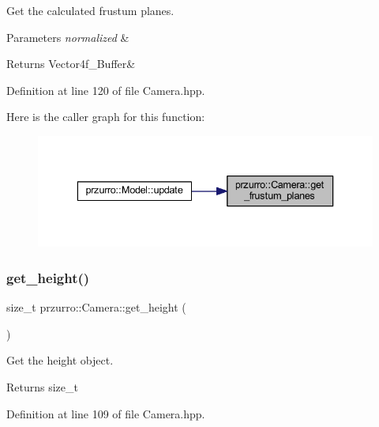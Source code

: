 Get the calculated frustum planes. 


\begin{DoxyParams}{Parameters}
{\em normalized} & \\
\hline
\end{DoxyParams}
\begin{DoxyReturn}{Returns}
Vector4f\+\_\+\+Buffer\& 
\end{DoxyReturn}


Definition at line 120 of file Camera.\+hpp.

Here is the caller graph for this function\+:
\nopagebreak
\begin{figure}[H]
\begin{center}
\leavevmode
\includegraphics[width=336pt]{d2/d9a/classprzurro_1_1_camera_a6c95cd160d41adea4b7b706e387a9001_icgraph}
\end{center}
\end{figure}
\mbox{\label{classprzurro_1_1_camera_a53ed7c30a4f622b7c680c4d2bbc117d4}} 
\subsubsection{\texorpdfstring{get\_height()}{get\_height()}}
{\footnotesize\ttfamily size\+\_\+t przurro\+::\+Camera\+::get\+\_\+height (\begin{DoxyParamCaption}{ }\end{DoxyParamCaption})\hspace{0.3cm}{\ttfamily [inline]}}



Get the height object. 

\begin{DoxyReturn}{Returns}
size\+\_\+t 
\end{DoxyReturn}


Definition at line 109 of file Camera.\+hpp.

\mbox{\label{classprzurro_1_1_camera_a9de15db51e07c62b88de013a717add73}} 
